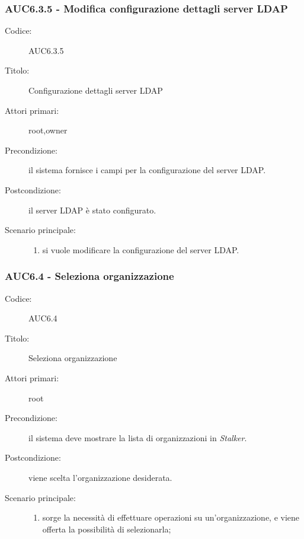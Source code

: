 \documentclass[casi-duso]{subfiles}
\begin{document}
\subsubsection{AUC6.3.5 - Modifica configurazione dettagli server LDAP}%
  \label{subsub:AUC6.3.5}
  \begin{description}
    \item[Codice:] AUC6.3.5
    \item[Titolo:] Configurazione dettagli server LDAP
    \item[Attori primari:] root,owner
    \item[Precondizione:] il sistema fornisce i campi per la configurazione del server LDAP.
    \item[Postcondizione:] il server LDAP è stato configurato.
    \item[Scenario principale:]
    \begin{enumerate}
      \item si vuole modificare la configurazione del server LDAP.
    \end{enumerate}
  \end{description}

\subsubsection{AUC6.4 - Seleziona organizzazione}%
\label{subsub:AUC6.4}
\begin{description}
  \item[Codice:] AUC6.4
  \item[Titolo:] Seleziona organizzazione
  \item[Attori primari:] root
  \item[Precondizione:] il sistema deve mostrare la lista di organizzazioni in \emph{Stalker}.
  \item[Postcondizione:] viene scelta l'organizzazione desiderata.
  \item[Scenario principale:]
  \begin{enumerate}
    \item sorge la necessità di effettuare operazioni su un'organizzazione, e viene offerta la possibilità di selezionarla;
  \end{enumerate}
\end{description}
\end{document}
